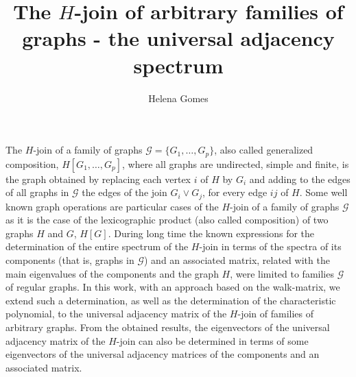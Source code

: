 \documentclass[a4paper]{amsart}
\date{}
\begin{document}
\title{The $H$-join of arbitrary families of graphs - the universal adjacency spectrum}
\author{Helena Gomes} %
\address{Center for Research and Development in Mathematics and Applications - CIDMA, University of Aveiro} %

\maketitle


The $H$-join of a family of graphs $\mathcal{G}=\{G_1, \dots, G_p\}$, also called generalized composition, $H[G_1, \dots, G_p]$, where all graphs are undirected, simple and finite, is the graph obtained by replacing each vertex $i$ of $H$ by $G_i$ and adding to the edges of all graphs in $\mathcal{G}$ the edges of the join $G_i \vee G_j$, for every edge $ij$ of $H$. Some well known graph operations are particular cases of the $H$-join of a family of graphs $\mathcal{G}$ as it is the case of the lexicographic product (also called composition) of two graphs $H$ and $G$, $H[G]$. During long time the known expressions for the determination of the entire spectrum of the $H$-join in terms of the spectra of its components (that is, graphs in $\mathcal{G}$) and an associated matrix, related with the main eigenvalues of the components and the graph $H$, were limited to families $\mathcal{G}$ of regular graphs. In this work, with an approach based on the walk-matrix, we extend such a determination, as well as the determination of the characteristic polynomial, to the universal adjacency matrix of the $H$-join of families of arbitrary graphs. From the obtained results, the eigenvectors of the universal adjacency matrix of the $H$-join can also be determined in terms of some eigenvectors of the universal adjacency matrices of the components and an associated matrix.%
%
%
%
\end{document}

